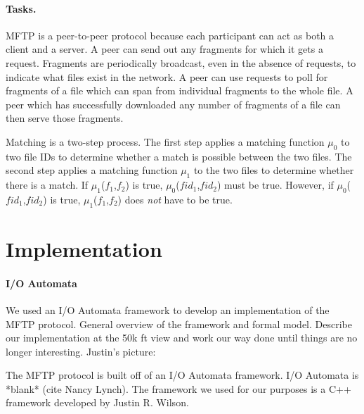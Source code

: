 \documentclass[letterpaper]{article}
\begin{document}
\paragraph {Tasks.}
MFTP is a peer-to-peer protocol because each participant can act as both a client and a server.
A peer can send out any fragments for which it gets a request.
Fragments are periodically broadcast, even in the absence of requests, to indicate what files exist in the network.
A peer can use requests to poll for fragments of a file which can span from individual fragments to the whole file.
A peer which has successfully downloaded any number of fragments of a file can then serve those fragments.

Matching is a two-step process.
The first step applies a matching function $\mu_0$ to two file IDs to determine whether a match is possible between the two files.  
The second step applies a matching function $\mu_1$ to the two files to determine whether there is a match.
If $\mu_1$($f_1$,$f_2$) is true, $\mu_0$($fid_1$,$fid_2$) must be true.
However, if $\mu_0$($fid_1$,$fid_2$) is true, $\mu_1$($f_1$,$f_2$) does \emph{not} have to be true. 


\section{Implementation}


\paragraph{I/O Automata}
We used an I/O Automata framework to develop an implementation of the MFTP protocol.
General overview of the framework and formal model.
Describe our implementation at the 50k ft view and work our way done until things are no longer interesting.
Justin's picture:


The MFTP protocol is built off of an I/O Automata framework.  I/O Automata is *blank* (cite Nancy Lynch). The framework we used for our purposes is a C++ framework developed by Justin R. Wilson.

\end{document}
